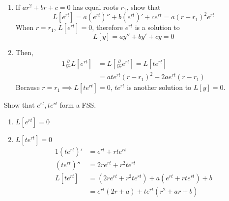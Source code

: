 \documentclass[diffeq.tex]{subfiles}
\begin{document}
    \begin{example}
        \begin{enumerate}
            \item If $ar^{2} + br + c = 0$ has equal roots $r_{1}$, show that
            \begin{equation}
                L[e^{rt}] = a(e^{rt})'' + b(e^{rt})' + ce^{rt} = a(r - r_{1})^{2}e^{rt}
            \end{equation}
            When $r = r_{1}$, $L[e^{rt}] = 0$, therefore $e^{rt}$ is a solution to
            \begin{equation}
                L[y] = ay'' + by' + cy = 0
            \end{equation}
            \item  Then,
            \begin{alignat}{1}
                \frac{\partial}{\partial r}L[e^{rt}] &= L[\frac{\partial}{\partial r}e^{rt}]=L[te^{rt}]\\
                &= ate^{rt}(r-r_{1})^{2} + 2ae^{rt}(r-r_{1})
            \end{alignat}
            Because $r = r_{1} \implies L[te^{rt}] = 0$, $te^{rt}$ is another solution to $L[y] = 0$.
        \end{enumerate}
        Show that $e^{rt}, te^{rt}$ form a FSS.
        \begin{enumerate}[label=\alph*.]
            \item $L[e^{rt}] = 0$
            \item $L[te^{rt}] = 0$
            \begin{alignat}{1}
                (te^{rt})' &= e^{rt} + rte^{rt}\\
                (te^{rt})'' &= 2re^{rt} + r^{2}te^{rt}\\
                L[te^{rt}] &= (2re^{rt} + r^{2}te^{rt}) + a(e^{rt} + rte^{rt}) + b\\
                &= e^{rt}(2r + a) + te^{rt}(r^{2} + ar + b)
            \end{alignat}
        \end{enumerate}
    \end{example}
\end{document}

